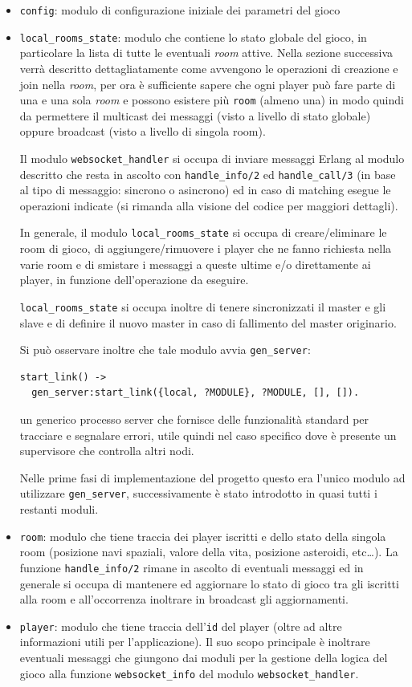 \documentclass[paper=a4, fontsize=11pt]{scrartcl} %
\numberwithin{equation}{section} %
\numberwithin{figure}{section} %
\numberwithin{table}{section} %
\begin{document}
\begin{itemize}
\item \texttt{config}: modulo di configurazione iniziale dei parametri del gioco
\item \texttt{local\_rooms\_state}: modulo che contiene lo stato globale del gioco, in particolare la lista di tutte le eventuali \textit{room} attive. Nella sezione successiva verrà descritto dettagliatamente come avvengono le operazioni di creazione e join nella \textit{room}, per ora è sufficiente sapere che ogni player può fare parte di una e una sola \textit{room} e possono esistere più \texttt{room} (almeno una) in modo quindi da permettere il multicast dei messaggi (visto a livello di stato globale) oppure broadcast (visto a livello di singola room).

Il modulo \texttt{websocket\_handler} si occupa di inviare messaggi Erlang al modulo descritto che resta in ascolto con \texttt{handle\_info/2} ed \texttt{handle\_call/3} (in base al tipo di messaggio: sincrono o asincrono) ed in caso di matching esegue le operazioni indicate (si rimanda alla visione del codice per maggiori dettagli).

In generale, il modulo \texttt{local\_rooms\_state} si occupa di creare/eliminare le room di gioco, di aggiungere/rimuovere i player che ne fanno richiesta nella varie room e di smistare i messaggi a queste ultime e/o direttamente ai player, in funzione dell'operazione da eseguire.

\texttt{local\_rooms\_state} si occupa inoltre di tenere sincronizzati il master e gli slave e di definire il nuovo master in caso di fallimento del master originario.


Si può osservare inoltre che tale modulo avvia \texttt{gen\_server}:
\begin{lstlisting}[basicstyle=\footnotesize]
start_link() ->
  gen_server:start_link({local, ?MODULE}, ?MODULE, [], []).
\end{lstlisting}
un generico processo server che fornisce delle funzionalità standard per tracciare e segnalare errori, utile quindi nel caso specifico dove è presente un supervisore che controlla altri nodi.

Nelle prime fasi di implementazione del progetto questo era l'unico modulo ad utilizzare \texttt{gen\_server}, successivamente è stato introdotto in quasi tutti i restanti moduli. 

\item \texttt{room}: modulo che tiene traccia dei player iscritti e dello stato della singola room (posizione navi spaziali, valore della vita, posizione asteroidi, etc\dots).
La funzione \texttt{handle\_info/2} rimane in ascolto di eventuali messaggi ed in generale si occupa di mantenere ed aggiornare lo stato di gioco tra gli iscritti alla room e all'occorrenza inoltrare in broadcast gli aggiornamenti.
\item \texttt{player}: modulo che tiene traccia dell'\texttt{id} del player (oltre ad altre informazioni utili per l'applicazione). Il suo scopo principale è inoltrare eventuali messaggi che giungono dai moduli per la gestione della logica del gioco alla funzione \texttt{websocket\_info} del modulo \texttt{websocket\_handler}.
\end{itemize}
\end{document}
